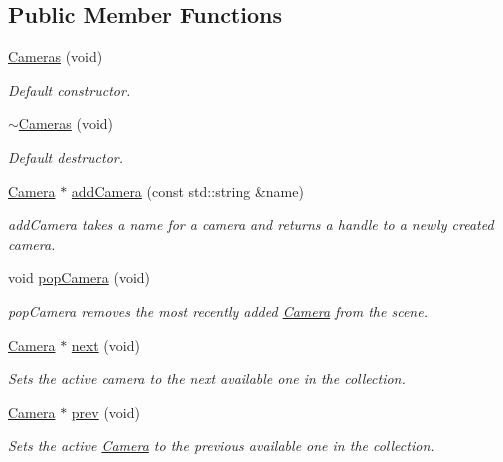 \subsection*{Public Member Functions}
\begin{DoxyCompactItemize}
\item 
\hyperlink{class_cameras_a14342354c24f588c24e004a722849c3d}{Cameras} (void)
\begin{DoxyCompactList}\small\item\em Default constructor. \end{DoxyCompactList}\item 
\hyperlink{class_cameras_a7de763b562cce2a06cb120610987cd29}{$\sim$\-Cameras} (void)
\begin{DoxyCompactList}\small\item\em Default destructor. \end{DoxyCompactList}\item 
\hyperlink{class_camera}{Camera} $\ast$ \hyperlink{class_cameras_a436b481bf293ec6dfa09d2f89054c54b}{add\-Camera} (const std\-::string \&name)
\begin{DoxyCompactList}\small\item\em add\-Camera takes a name for a camera and returns a handle to a newly created camera. \end{DoxyCompactList}\item 
void \hyperlink{class_cameras_a9dee7bf1f2c56176c461fa2617ce4549}{pop\-Camera} (void)
\begin{DoxyCompactList}\small\item\em pop\-Camera removes the most recently added \hyperlink{class_camera}{Camera} from the scene. \end{DoxyCompactList}\item 
\hyperlink{class_camera}{Camera} $\ast$ \hyperlink{class_cameras_a971e1ffd27ff38d58f83996f87700e82}{next} (void)
\begin{DoxyCompactList}\small\item\em Sets the active camera to the next available one in the collection. \end{DoxyCompactList}\item 
\hyperlink{class_camera}{Camera} $\ast$ \hyperlink{class_cameras_a90eb5a3dda940ed494f592d094580dd8}{prev} (void)
\begin{DoxyCompactList}\small\item\em Sets the active \hyperlink{class_camera}{Camera} to the previous available one in the collection. \end{DoxyCompactList}\item 

\end{DoxyCompactItemize}
